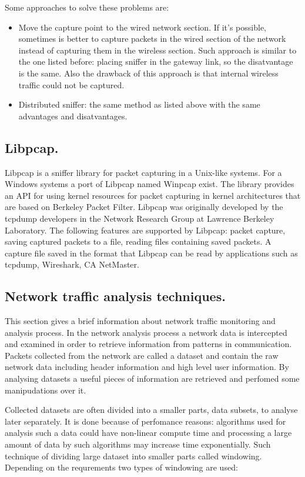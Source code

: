 \documentclass[thesis=M,english]{FITthesis}[2011/07/15]
\begin{document}
Some approaches to solve these problems are:
\begin{itemize}
\item Move the capture point to the wired network section. If it's possible, sometimes is better to capture packets in the wired section of the network instead of capturing them in the wireless section. Such approach is similar to the one listed before: placing sniffer in the gateway link, so the disatvantage is the same. Also the drawback of this approach is that internal wireless traffic could not be captured.

\item Distributed sniffer: the same method as listed above with the same advantages and disatvantages.
\end{itemize}

\subsection{Libpcap.}
Libpcap is a sniffer library for packet capturing in a Unix-like systems. For a Windows systems a port of Libpcap named Winpcap exist. The library provides an API for using kernel resources for packet capturing in kernel architectures that are based on Berkeley Packet Filter. Libpcap was originally developed by the tcpdump developers in the Network Research Group at Lawrence Berkeley Laboratory. The following features are supported by Libpcap: packet capture, saving captured packets to a file, reading files containing saved packets. A capture file saved in the format that Libpcap can be read by applications such as tcpdump, Wireshark, CA NetMaster.

\subsection{Network traffic analysis techniques.}
This section gives a brief information about network traffic monitoring and analysis process. In the network analysis process a network data is intercepted and examined in order to retrieve information from patterns in communication. Packets collected from the network are called a dataset and contain the raw network data including header information and high level user information. By analysing datasets a useful pieces of information are retrieved and perfomed some manipudations over it.

Collected datasets are often divided into a smaller parts, data subsets, to analyse later separately. It is done because of perfomance reasons: algorithms used for analysis such a data could have non-linear compute time and processing a large amount of data by such algorithms may increase time exponentially. Such technique of dividing large dataset into smaller parts called windowing. Depending on the requrements two types of windowing are used:
\end{document}
